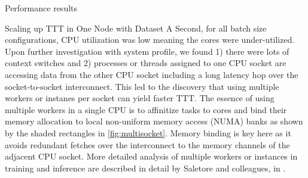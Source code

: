 \begin{section}{Performance results}
\begin{subsection}{Scaling up TTT in One Node with Dataset A}
\noindent Second, for all batch size configurations, CPU utilization was low meaning the cores were under-utilized. Upon further investigation with system profile, we found 1) there were lots of context switches and 2) processes or threads assigned to one CPU socket are accessing data from the other CPU socket including a long latency hop over the socket-to-socket interconnect. This led to the discovery that using multiple workers or instanes per socket can yield faster TTT. The essence of using multiple workers in a single CPU is to affinitize tasks to cores and bind their memory allocation to local non-uniform memory access (NUMA) banks as shown by the shaded rectangles in \autoref{fig:multisocket}. Memory binding is key here as it avoids redundant fetches over the interconnect to the memory channels of the adjacent CPU socket. More detailed analysis of multiple workers or instances in training and inference are described in detail by Saletore and colleagues, in \cite{Saletore2018}. \\


\end{subsection}
\end{section}
